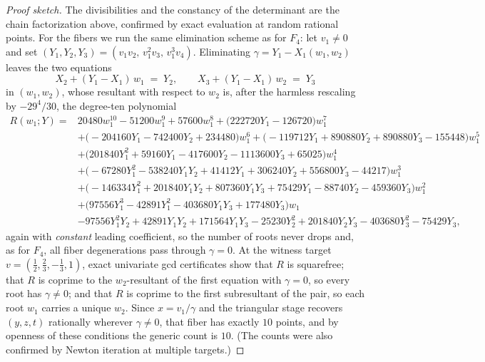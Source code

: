 \documentclass[11pt]{article}
\theoremstyle{plain}
\theoremstyle{definition}
\theoremstyle{remark}
\begin{document}
\begin{proof}[Proof sketch]
The divisibilities and the constancy of the determinant are the chain
factorization above, confirmed by exact evaluation at random rational points.
For the fibers we run the same elimination scheme as for $F_4$: let
$v_1\neq0$ and set $(Y_1,Y_2,Y_3)=(v_1v_2,\,v_1^2v_3,\,v_1^3v_4)$. Eliminating
$\gamma=Y_1-X_1(w_1,w_2)$ leaves the two equations
\[
X_2+(Y_1-X_1)\,w_1\;=\;Y_2,\qquad X_3+(Y_1-X_1)\,w_2\;=\;Y_3
\]
in $(w_1,w_2)$, whose resultant with respect to $w_2$ is, after the harmless
rescaling by $-29^4/30$, the degree-ten polynomial
{\small
\begin{align*}
R(w_1;Y)={}&20480w_1^{10}-51200w_1^{9}+57600w_1^{8}+\bigl(222720Y_1-126720\bigr)w_1^{7}\\
&+\bigl(-204160Y_1-742400Y_2+234480\bigr)w_1^{6}
+\bigl(-119712Y_1+890880Y_2+890880Y_3-155448\bigr)w_1^{5}\\
&+\bigl(201840Y_1^2+59160Y_1-417600Y_2-1113600Y_3+65025\bigr)w_1^{4}\\
&+\bigl(-67280Y_1^2-538240Y_1Y_2+41412Y_1+306240Y_2+556800Y_3-44217\bigr)w_1^{3}\\
&+\bigl(-146334Y_1^2+201840Y_1Y_2+807360Y_1Y_3+75429Y_1-88740Y_2-459360Y_3\bigr)w_1^{2}\\
&+\bigl(97556Y_1^3-42891Y_1^2-403680Y_1Y_3+177480Y_3\bigr)w_1\\
&-97556Y_1^2Y_2+42891Y_1Y_2+171564Y_1Y_3-25230Y_2^2+201840Y_2Y_3-403680Y_3^2-75429Y_3 ,
\end{align*}
}
again with \emph{constant} leading coefficient, so the number of roots never
drops and, as for $F_4$, all fiber degenerations pass through $\gamma=0$. At
the witness target
$v=(\tfrac12,\tfrac23,-\tfrac13,1)$, exact univariate gcd certificates show
that $R$ is squarefree; that $R$ is coprime to the $w_2$-resultant of the
first equation with $\gamma=0$, so every root has $\gamma\neq0$; and that $R$
is coprime to the first subresultant of the pair, so each root $w_1$ carries a
unique $w_2$. Since $x=v_1/\gamma$ and the triangular stage recovers $(y,z,t)$
rationally wherever $\gamma\neq0$, that fiber has exactly $10$ points, and by
openness of these conditions the generic count is $10$. (The counts were also
confirmed by Newton iteration at multiple targets.)
\end{proof}
\end{document}
